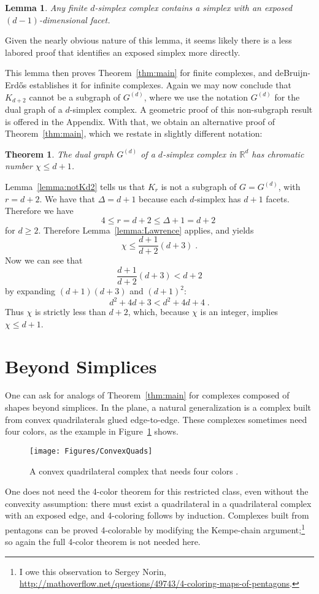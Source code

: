 \pdfoutput=1  \documentclass[]{article}
\newcommand{\ABox}{
\raisebox{3pt}{\framebox[6pt]{\rule{6pt}{0pt}}}
}
\newenvironment{proof}{{\bf Proof:}}{\hfill\ABox}
\newtheorem{theorem}{{\bf Theorem}}
\newtheorem{lemma}{Lemma}
\newcommand{\lemlab}[1]{\label{lemma:#1}}
\newcommand{\figlab}[1]{\label{fig:#1}}
\newcommand{\seclab}[1]{\label{sec:#1}}
\newcommand{\lemref}[1]{\ref{lemma:#1}}
\newcommand{\thmref}[1]{\ref{thm:#1}}
\newcommand{\figref}[1]{\ref{fig:#1}}
\def\R{{\mathbb{R}}}
\def\D{{\Delta}}
\def\c{{\chi}}
\begin{document}
\begin{lemma}
Any finite $d$-simplex complex contains a simplex with an 
exposed  $(d{-}1)$-dimensional
facet.
\lemlab{exposed}
\end{lemma}
\noindent
Given the nearly obvious nature of
this lemma, it seems likely there is a less labored proof
that identifies an exposed simplex more directly.

This lemma then proves Theorem~\thmref{main} for finite complexes,
and deBruijn-Erd\H{o}s establishes it for infinite complexes.
Again we may now conclude that $K_{d+2}$ cannot be a subgraph
of $G^{(d)}$,
where
we use the notation $G^{(d)}$ for the dual graph of a $d$-simplex
complex.
A geometric proof of this non-subgraph result is offered in the
Appendix.
With that, we obtain an alternative proof of  Theorem~\thmref{main},
which we restate in slightly different notation:
\begin{theorem}
The dual graph $G^{(d)}$ of a $d$-simplex complex in $\R^d$
has chromatic number $\c \le d+1$.
\end{theorem}
\begin{proof}
Lemma~\lemref{notKd2} tells us that $K_r$ is not a subgraph of
$G=G^{(d)}$,
with $r=d+2$.
We have that $\D = d+1$ because each $d$-simplex has $d+1$ facets.
Therefore we have 
$$4 \le r=d+2 \le \D + 1 = d+2 \;$$
for $d \ge 2$.
Therefore
Lemma~\lemref{Lawrence} applies, and yields
$$\c \le \frac{d+1}{d+2} (d+3) \;.$$
Now we can see that 
$$\frac{d+1}{d+2} (d+3) < d+2$$
by expanding $(d+1)(d+3)$ and $(d+1)^2$:
$$d^2 + 4d + 3 < d^2 + 4d + 4 \;.$$
Thus $\c$ is strictly less than $d+2$, which, because $\c$ is an
integer,
implies $\c \le d+1$.
\end{proof}



\section{Beyond Simplices}
\seclab{Beyond}
One can ask for analogs of Theorem~\thmref{main} for complexes composed
of shapes beyond simplices.
In the plane, a natural generalization is a complex built from
convex quadrilaterals glued edge-to-edge.
These complexes sometimes need four colors, as
the example in 
Figure~\figref{ConvexQuads} shows.
\begin{figure}[htbp]
\centering
\texttt{[image: Figures/ConvexQuads]}
\figlab{ConvexQuads}
\caption{A convex quadrilateral complex that needs four colors
\protect\cite[Fig.3a]{sw-rpt3c-00}.
}
\end{figure}
One does not need the 4-color theorem for this restricted class,
even without the convexity assumption:
there must exist a quadrilateral in a quadrilateral complex
with an exposed edge, and
4-coloring follows by induction.
Complexes built from pentagons 
can be proved
4-colorable by modifying the Kempe-chain argument;\footnote{
   I owe this observation to Sergey Norin,
   \url{http://mathoverflow.net/questions/49743/4-coloring-maps-of-pentagons}.
} 
so again
the full 4-color theorem is not needed here.
\end{document}
